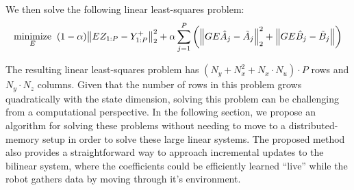 \documentclass{article}
\begin{document}
We then solve the following linear least-squares problem:
\begin{align} \label{opt:jdmd}
  \underset{E}{\text{minimize}} \;\; 
    (1-\alpha) \norm{E Z_{1:P} - Y_{1:P}^+}_2^2 + 
        \alpha \sum_{j=1}^P \left( 
          \norm{G E \hat{A}_j - \tilde{A}_j}_2^2 + 
          \norm{G E \hat{B}_j - \tilde{B}_j} \right)
\end{align}

The resulting linear least-squares problem has $(N_y + N_x^2 + N_x \cdot N_u) \cdot P$ rows
and $N_y \cdot N_z$ columns. Given that the number of rows in this problem grows
quadratically with the state dimension, solving this problem can be challenging from a
computational perspective. In the following section, we propose an algorithm for solving
these problems without needing to move to a distributed-memory setup in order to solve these
large linear systems. The proposed method also provides a straightforward way to approach
incremental updates to the bilinear system, where the coefficients could be efficiently
learned ``live'' while the robot gathers data by moving through it's environment.



\end{document}
